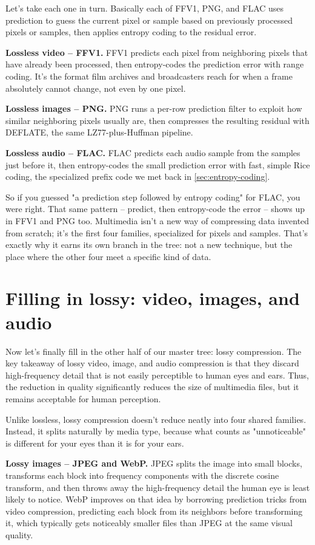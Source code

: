 \documentclass[11pt]{article}
\begin{document}
Let's take each one in turn. Basically each of FFV1, PNG, and FLAC uses prediction to guess the current pixel or sample based on previously processed pixels or samples, then applies entropy coding to the residual error.

\textbf{Lossless video -- FFV1.} 
FFV1 predicts each pixel from neighboring pixels that have already been processed, then entropy-codes the prediction error with range coding. It's the format film archives and broadcasters reach for when a frame absolutely cannot change, not even by one pixel.

\textbf{Lossless images -- PNG.} PNG runs a per-row prediction filter to exploit how similar neighboring pixels usually are, then compresses the resulting residual with DEFLATE, the same LZ77-plus-Huffman pipeline.

\textbf{Lossless audio -- FLAC.} FLAC predicts each audio sample from the samples just before it, then entropy-codes the small prediction error with fast, simple Rice coding, the specialized prefix code we met back in \ref{sec:entropy-coding}.

So if you guessed "a prediction step followed by entropy coding" for FLAC, you were right. That same pattern -- predict, then entropy-code the error -- shows up in FFV1 and PNG too. Multimedia isn't a new way of compressing data invented from scratch; it's the first four families, specialized for pixels and samples. That's exactly why it earns its own branch in the tree: not a new technique, but the place where the other four meet a specific kind of data.

\section{Filling in lossy: video, images, and audio}
\label{sec:lossy-fill}

Now let's finally fill in the other half of our master tree: lossy compression. The key takeaway of lossy video, image, and audio compression is that they discard high-frequency detail that is not easily perceptible to human eyes and ears. Thus, the reduction in quality significantly reduces the size of multimedia files, but it remains acceptable for human perception.

Unlike lossless, lossy compression doesn't reduce neatly into four shared families. Instead, it splits naturally by media type, because what counts as "unnoticeable" is different for your eyes than it is for your ears.

\textbf{Lossy images -- JPEG and WebP.} JPEG splits the image into small blocks, transforms each block into frequency components with the discrete cosine transform, and then throws away the high-frequency detail the human eye is least likely to notice. WebP improves on that idea by borrowing prediction tricks from video compression, predicting each block from its neighbors before transforming it, which typically gets noticeably smaller files than JPEG at the same visual quality.
\end{document}
